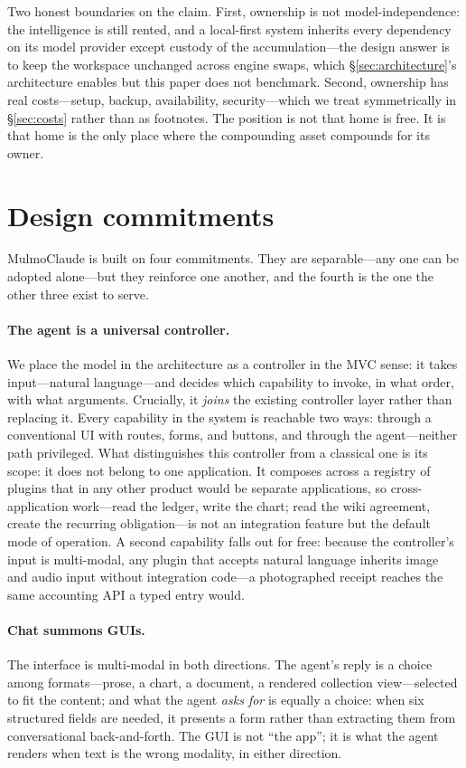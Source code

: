 \documentclass[11pt]{article}
\begin{document}
Two honest boundaries on the claim. First, ownership is not model-independence:
the intelligence is still rented, and a local-first system inherits every
dependency on its model provider except custody of the accumulation---the design
answer is to keep the workspace unchanged across engine swaps, which
\S\ref{sec:architecture}'s architecture enables but this paper does not
benchmark. Second, ownership has real costs---setup, backup, availability,
security---which we treat symmetrically in \S\ref{sec:costs} rather than as
footnotes. The position is not that home is free. It is that home is the only
place where the compounding asset compounds for its owner.

\section{Design commitments}
\label{sec:design}

MulmoClaude is built on four commitments. They are separable---any one can be
adopted alone---but they reinforce one another, and the fourth is the one the
other three exist to serve.

\paragraph{The agent is a universal controller.}
We place the model in the architecture as a controller in the MVC sense: it takes
input---natural language---and decides which capability to invoke, in what order,
with what arguments. Crucially, it \emph{joins} the existing controller layer
rather than replacing it. Every capability in the system is reachable two ways:
through a conventional UI with routes, forms, and buttons, and through the
agent---neither path privileged. What distinguishes this controller from a
classical one is its scope: it does not belong to one application. It composes
across a registry of plugins that in any other product would be separate
applications, so cross-application work---read the ledger, write the chart; read
the wiki agreement, create the recurring obligation---is not an integration
feature but the default mode of operation. A second capability falls out for
free: because the controller's input is multi-modal, any plugin that accepts
natural language inherits image and audio input without integration code---a
photographed receipt reaches the same accounting API a typed entry would.

\paragraph{Chat summons GUIs.}
The interface is multi-modal in both directions. The agent's reply is a choice
among formats---prose, a chart, a document, a rendered collection view---selected
to fit the content; and what the agent \emph{asks for} is equally a choice: when
six structured fields are needed, it presents a form rather than extracting them
from conversational back-and-forth. The GUI is not ``the app''; it is what the
agent renders when text is the wrong modality, in either direction.
\end{document}

